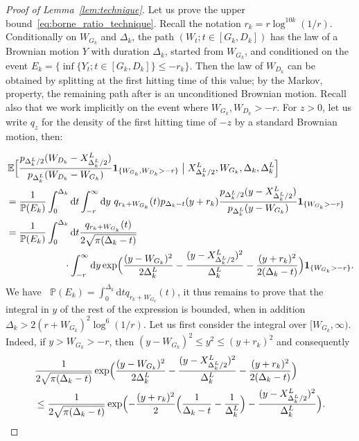 \documentclass[10pt,a4paper]{amsart}
\newcommand{\E}{\mathop{}\!\mathbb{E}}
\newcommand{\ind}[1]{\mathbf{1}_{\{#1\}}}
\renewcommand{\P}{\mathop{}\!\mathbb{P}}
\renewcommand{\d}{\mathrm{d}}
\begin{document}
\begin{proof}[Proof of Lemma~\ref{lem:technique}]
Let us prove the upper bound~\eqref{eq:borne_ratio_technique}. Recall the notation $r_{k}=r \log^{10k}(1/r)$.
Conditionally on $W_{G_k}$ and $\Delta_k$, the path $(W_t; t \in [G_k, D_k])$ has the law of a Brownian motion $Y$ with duration $\Delta_k$, started from $W_{G_k}$, and conditioned on the event $E_k = \{\inf\{Y_t ; t \in [G_k, D_k]\} \leq -r_{k}\}$. Then the law of $W_{D_k}$ can be obtained by splitting at the first hitting time of this value; by the Markov, property, the remaining path after is an unconditioned Brownian motion. Recall also that we work implicitly on the event where $W_{G_k}, W_{D_k} > -r$. 
For $z>0$, let us write $q_z$ for the density of the first hitting time of $-z$ by a standard Brownian motion, 
then:




\begin{align*}
&\E\Bigl[\frac{p_{\Delta^L_k/2}(W_{D_k}-X^L_{\Delta^L_k/2})}{p_{\Delta^L_k}(W_{D_k}-W_{G_k})} \ind{W_{G_k}, W_{D_k}>-r} \bigm| X^L_{\Delta^L_k/2}, W_{G_k}, \Delta_k, \Delta^L_k\Bigr]
\\
&= \frac{1}{\P(E_k)} \int_0^{\Delta_k} \d t \int_{-r}^\infty \d y\ q_{r_{k}+W_{G_k}}(t) p_{\Delta_k-t}(y+r_{k})  \frac{p_{\Delta^L_k/2}(y-X^L_{\Delta^L_k/2})}{p_{\Delta^L_k}(y-W_{G_k})} \ind{W_{G_k}>-r}
\\
&= \frac{1}{\P(E_k)} \int_0^{\Delta_k} \d t \frac{q_{r_{k}+W_{G_k}}(t)}{2\sqrt{\pi(\Delta_k-t)}}  \\
& \qquad  \qquad \qquad \cdot \int_{-r}^\infty \d y \exp\Bigl(\frac{(y-W_{G_k})^2}{2\Delta^L_k} - \frac{(y-X^L_{\Delta^L_k/2})^2}{\Delta^L_k} - \frac{(y+r_{k})^2}{2(\Delta_k-t)}\Bigr) \ind{W_{G_k}>-r}
.\end{align*}
We have $\P(E_k) = \int_0^{\Delta_k} \d t q_{r_{k}+W_{G_k}}(t)$, it thus remains to prove that the integral in $y$ of the rest of the expression is bounded, when in addition $\Delta_k > 2(r+W_{G_k})^2 \log^6(1/r)$.
Let us first consider the integral over $[W_{G_k}, \infty)$. Indeed, if $y > W_{G_k} > -r$, then $(y-W_{G_k})^2 \leq y^2 \leq (y+r_{k})^2$ and consequently
\begin{align*}
&\frac{1}{2\sqrt{\pi(\Delta_k-t)}} \exp\Bigl(\frac{(y-W_{G_k})^2}{2\Delta^L_k} - \frac{(y-X^L_{\Delta^L_k/2})^2}{\Delta^L_k} - \frac{(y+r_{k})^2}{2(\Delta_k-t)}\Bigr)
\\
&\leq \frac{1}{2\sqrt{\pi(\Delta_k-t)}} \exp\Bigl(- \frac{(y+r_{k})^2}{2} \Bigl(\frac{1}{\Delta_k-t}-\frac{1}{\Delta^L_k}\Bigr) - \frac{(y-X^L_{\Delta^L_k/2})^2}{\Delta^L_k}\Bigr)
.\end{align*}

\end{proof}
\end{document}
